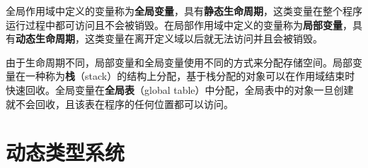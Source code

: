 全局作用域中定义的变量称为\textbf{全局变量}，具有\textbf{静态生命周期}，这类变量在整个程序运行过程中都可访问且不会被销毁。在局部作用域中定义的变量称为\textbf{局部变量}，具有\textbf{动态生命周期}，这类变量在离开定义域以后就无法访问并且会被销毁。

由于生命周期不同，局部变量和全局变量使用不同的方式来分配存储空间。局部变量在一种称为\textbf{栈}（stack）的结构上分配，基于栈分配的对象可以在作用域结束时快速回收。全局变量在\textbf{全局表}（global table）中分配，全局表中的对象一旦创建就不会回收，且该表在程序的任何位置都可以访问。

\section{动态类型系统}
